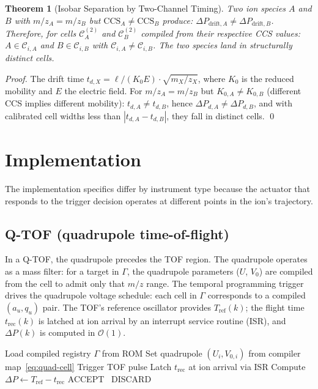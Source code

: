 \documentclass[twocolumn,10pt,a4paper]{article}
\theoremstyle{thmstyle}
\newtheorem{theorem}{Theorem}[section]
\theoremstyle{definition}
\theoremstyle{remark}
\newcommand{\DP}{\Delta P}
\newcommand{\Tref}{T_{\mathrm{ref}}}
\newcommand{\trec}{t_{\mathrm{rec}}}
\newcommand{\calC}{\mathcal{C}}
\begin{document}
\begin{theorem}[Isobar Separation by Two-Channel Timing]
Two ion species $A$ and $B$ with $m/z_A = m/z_B$ but
$\mathrm{CCS}_A \neq \mathrm{CCS}_B$ produce:
$\DP_{\mathrm{drift},A} \neq \DP_{\mathrm{drift},B}$.
Therefore, for cells $\calC^{(2)}_A$ and $\calC^{(2)}_B$ compiled
from their respective CCS values:
$A \in \calC_{i,A}$ and $B \in \calC_{i,B}$ with $\calC_{i,A} \neq \calC_{i,B}$.
The two species land in structurally distinct cells.
\end{theorem}

\begin{proof}
The drift time $t_{d,X} = \ell/(K_0 E) \cdot \sqrt{m_X/z_X}$, where
$K_0$ is the reduced mobility and $E$ the electric field. For
$m/z_A = m/z_B$ but $K_{0,A} \neq K_{0,B}$ (different CCS implies
different mobility): $t_{d,A} \neq t_{d,B}$, hence
$\DP_{d,A} \neq \DP_{d,B}$, and with calibrated cell widths less than
$|t_{d,A} - t_{d,B}|$, they fall in distinct cells. \qed
\end{proof}

\section{Implementation}
\label{sec:impl}

The implementation specifics differ by instrument type because the
actuator that responds to the trigger decision operates at different
points in the ion's trajectory.

\subsection{Q-TOF (quadrupole time-of-flight)}

In a Q-TOF, the quadrupole precedes the TOF region. The quadrupole
operates as a mass filter: for a target in $\Gamma$, the quadrupole
parameters ($U$, $V_0$) are compiled from the cell to admit only that
$m/z$ range. The temporal programming trigger drives the quadrupole
voltage schedule: each cell in $\Gamma$ corresponds to a compiled
$(a_u, q_u)$ pair. The TOF's reference oscillator provides $\Tref(k)$;
the flight time $\trec(k)$ is latched at ion arrival by an interrupt
service routine (ISR), and $\DP(k)$ is computed in $\mathcal{O}(1)$.

\begin{algorithm}[h]
\caption{Q-TOF temporal programming acquisition}
\label{alg:qtof}
\begin{algorithmic}[1]
\State Load compiled registry $\Gamma$ from ROM
\For{each target window $\calC_i \in \Gamma$}
  \State Set quadrupole $(U_i, V_{0,i})$ from compiler map~\eqref{eq:quad-cell}
  \State Trigger TOF pulse
  \State Latch $\trec$ at ion arrival via ISR
  \State Compute $\DP \gets \Tref - \trec$
  \If{$\DP \in \calC_i^{\mathrm{TOF}}$} ACCEPT \Else\ DISCARD
  \EndIf
\EndFor
\end{algorithmic}
\end{algorithm}
\end{document}
